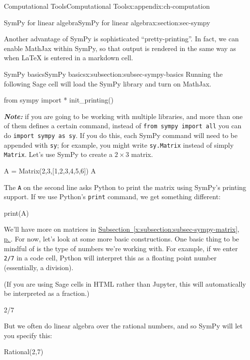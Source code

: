 \documentclass[oneside,10pt,]{book}
\newcommand{\xreffont}{\relax}
\newcommand{\mono}[1]{\texttt{#1}}
\newcommand{\alert}[1]{\textbf{\textit{#1}}}
\numberwithin{equation}{section}
\begin{document}
\begin{appendixptx}{Computational Tools}{}{Computational Tools}{}{}{x:appendix:ch-computation}
\begin{sectionptx}{SymPy for linear algebra}{}{SymPy for linear algebra}{}{}{x:section:sec-sympy}
\begin{introduction}{}
\par
Another advantage of SymPy is sophisticated ``pretty-printing''. In fact, we can enable MathJax within SymPy, so that output is rendered in the same way as when LaTeX is entered in a markdown cell.%
\end{introduction}%
%
%
\typeout{************************************************}
\typeout{************************************************}
%
\begin{subsectionptx}{SymPy basics}{}{SymPy basics}{}{}{x:subsection:subsec-sympy-basics}
Running the following Sage cell will load the SymPy library and turn on MathJax.%
\begin{sageinput}
from sympy import *
init_printing()
\end{sageinput}
\alert{Note:} if you are going to be working with multiple libraries, and more than one of them defines a certain command, instead of \mono{from sympy import all} you can do \mono{import sympy as sy}. If you do this, each SymPy command will need to be appended with \mono{sy}; for example, you might write \mono{sy.Matrix} instead of simply \mono{Matrix}. Let's use SymPy to create a \(2\times 3\) matrix.%
\begin{sageinput}
A = Matrix(2,3,[1,2,3,4,5,6])
A
\end{sageinput}
The \mono{A} on the second line asks Python to print the matrix using SymPy's printing support. If we use Python's \mono{print} command, we get something different:%
\begin{sageinput}
print(A)
\end{sageinput}
We'll have more on matrices in \hyperref[x:subsection:subsec-sympy-matrix]{Subsection~{\xreffont\ref{x:subsection:subsec-sympy-matrix}}, p.\,\pageref{x:subsection:subsec-sympy-matrix}}. For now, let's look at some more basic constructions. One basic thing to be mindful of is the type of numbers we're working with. For example, if we enter \mono{2/7} in a code cell, Python will interpret this as a floating point number (essentially, a division).%
\par
(If you are using Sage cells in HTML rather than Jupyter, this will automatically be interpreted as a fraction.)%
\begin{sageinput}
2/7
\end{sageinput}
But we often do linear algebra over the rational numbers, and so SymPy will let you specify this:%
\begin{sageinput}
Rational(2,7)
\end{sageinput}

\end{subsectionptx}
\end{sectionptx}
\end{appendixptx}
\end{document}
